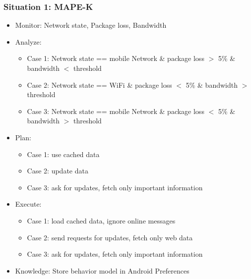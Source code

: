 \documentclass[aspectratio=169]{beamer}
\begin{document}
\begin{frame}   
	\frametitle{Situation 1: MAPE-K}
	\begin{itemize}
		\item Monitor: Network state, Package loss, Bandwidth
		\item Analyze: 
			 \begin{itemize} 
				\item Case 1: Network state == mobile Network \& package loss $>$ 5\% \& bandwidth $<$ threshold
				\item Case 2: Network state == WiFi \& package loss $<$ 5\% \& bandwidth $>$ threshold
				\item Case 3: Network state == mobile Network \& package loss $<$ 5\% \& bandwidth $>$ threshold
			\end{itemize}
		\item Plan:
			\begin{itemize}
				\item Case 1: use cached data 
				\item Case 2: update data
				\item Case 3: ask for updates, fetch only important information
			\end{itemize}
		\item Execute:
			\begin{itemize}
				\item Case 1: load cached data, ignore online messages
    				\item Case 2: send requests for updates, fetch only web data 
    				\item Case 3: ask for updates, fetch only important information
			\end{itemize}
		\item Knowledge: Store behavior model in Android Preferences
	\end{itemize}
\end{frame}
\end{document}
